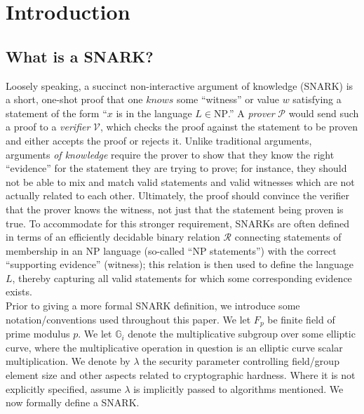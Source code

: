 \section{Introduction}
\subsection{What is a SNARK?}
\noindent Loosely speaking, a succinct non-interactive argument of knowledge (SNARK) is a short, one-shot proof that one $knows$ some ``witness'' or value $w$ satisfying a statement of the form ``$x$ is in the language $L \in \text{NP}$.'' A \textit{prover} $\mathcal{P}$ would send such a proof to a \textit{verifier} $\mathcal{V}$, which checks the proof against the statement to be proven and either accepts the proof or rejects it. Unlike traditional arguments, arguments \textit{of knowledge} require the prover to show that they know the right ``evidence'' for the statement they are trying to prove; for instance, they should not be able to mix and match valid statements and valid witnesses which are not actually related to each other. Ultimately, the proof should convince the verifier that the prover knows the witness, not just that the statement being proven is true. To accommodate for this stronger requirement, SNARKs are often defined in terms of an efficiently decidable binary relation $\mathcal{R}$ connecting statements of membership in an NP language (so-called ``NP statements'') with the correct ``supporting evidence'' (witness); this relation is then used to define the language $L$, thereby capturing all valid statements for which some corresponding evidence exists.\\ 

\noindent Prior to giving a more formal SNARK definition, we introduce some notation/conventions used throughout this paper. We let $F_p$ be finite field of prime modulus $p$. We let $\mathbb{G}_i$ denote the multiplicative subgroup over some elliptic curve, where the multiplicative operation in question is an elliptic curve scalar multiplication. We denote by $\lambda$ the security parameter controlling field/group element size and other aspects related to cryptographic hardness. Where it is not explicitly specified, assume $\lambda$ is implicitly passed to algorithms mentioned. We now formally define a SNARK.\\  

